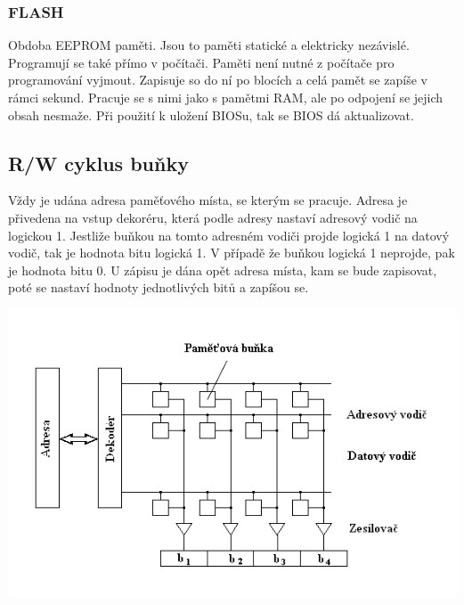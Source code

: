 \subsubsection{FLASH}
Obdoba EEPROM paměti.
Jsou to paměti statické a elektricky nezávislé.
Programují se také přímo v počítači.
Paměti není nutné z počítače pro programování vyjmout.
Zapisuje so do ní po blocích a celá pamět se zapíše v rámci sekund.
Pracuje se s nimi jako s pamětmi RAM, ale po odpojení se jejich obsah nesmaže.
Při použití k uložení BIOSu, tak se BIOS dá aktualizovat.
\subsection{R/W cyklus buňky}
\begin{multicols}{2}
    Vždy je udána adresa paměťového místa, se kterým se pracuje.
    Adresa je přivedena na vstup dekoréru, která podle adresy nastaví adresový vodič na logickou 1.
    Jestliže buňkou na tomto adresném vodiči projde logická 1 na datový vodič, tak je hodnota bitu logická 1.
    V případě že buňkou logická 1 neprojde, pak je hodnota bitu 0.
    U zápisu je dána opět adresa místa, kam se bude zapisovat, poté se nastaví hodnoty jednotlivých bitů a zapíšou se.\\
    \columnbreak

    \includegraphics[width=0.9\linewidth]{TVY-POS/Polovodičové paměti/memorystructure.png}
\end{multicols}
